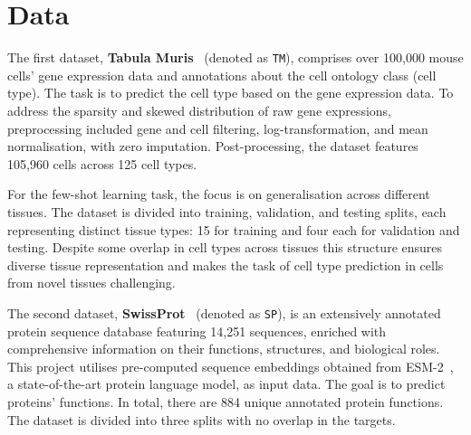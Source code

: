 \section{Data}

The first dataset, \textbf{Tabula Muris}~\cite{tabula2018} (denoted as \texttt{TM}), comprises over 100,000 mouse cells' gene expression 
data and annotations about the cell ontology class (cell type). The task is to predict the cell type based on the gene expression data. 
To address the sparsity and skewed distribution of raw gene expressions, preprocessing included gene and cell filtering, log-transformation, 
and mean normalisation, with zero imputation. Post-processing, the dataset features 105,960 cells across 125 cell types.

For the few-shot learning task, the focus is on generalisation across different tissues. The dataset is divided into training, validation, and testing splits, 
each representing distinct tissue types: 15 for training and four each for validation and testing. Despite some overlap in cell types across tissues this structure 
ensures diverse tissue representation and makes the task of cell type prediction in cells from novel tissues challenging.

The second dataset, \textbf{SwissProt}~\cite{uniprot2019} (denoted as \texttt{SP}), is an extensively annotated protein sequence database 
featuring 14,251 sequences, enriched with comprehensive information on their functions, structures, and biological roles. 
This project utilises pre-computed sequence embeddings obtained from ESM-2~\cite{esm-2}, a state-of-the-art protein language model, as input data. 
The goal is to predict proteins' functions. In total, there are 884 unique annotated protein functions. 
The dataset is divided into three splits with no overlap in the targets.
